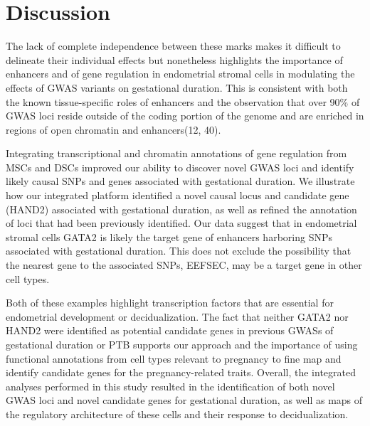 \begin{figure}
\begin{subfigure}[t]{\textwidth}
    \end{subfigure}
\end{figure}





\section{Discussion}\label{sec:org53f1196}

 The lack of complete independence between these marks makes it difficult to delineate their individual effects but nonetheless highlights the importance of enhancers and of gene regulation in endometrial stromal cells in modulating the effects of GWAS variants on gestational duration. This is consistent with both the known tissue-specific roles of enhancers and the observation that over 90\% of GWAS loci reside outside of the coding portion of the genome and are enriched in regions of open chromatin and enhancers(12, 40). 

    Integrating transcriptional and chromatin annotations of gene regulation from MSCs and DSCs improved our ability to discover novel GWAS loci and identify likely causal SNPs and genes associated with gestational duration. We illustrate how our integrated platform identified a novel causal locus and candidate gene (HAND2) associated with gestational duration, as well as refined the annotation of loci that had been previously identified. Our data suggest that in endometrial stromal cells GATA2 is likely the target gene of enhancers harboring SNPs associated with gestational duration. This does not exclude the possibility that the nearest gene to the associated SNPs, EEFSEC, may be a target gene in other cell types.  

    Both of these examples highlight transcription factors that are essential for endometrial development or decidualization. The fact that neither GATA2 nor HAND2 were identified as potential candidate genes in previous GWASs of gestational duration or PTB supports our approach and the importance of using functional annotations from cell types relevant to pregnancy to fine map and identify candidate genes for the pregnancy-related traits. Overall, the integrated analyses performed in this study resulted in the identification of both novel GWAS loci and novel candidate genes for gestational duration, as well as maps of the regulatory architecture of these cells and their response to decidualization. 

